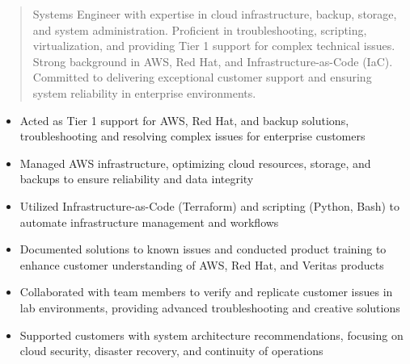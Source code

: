 



\makecvheader

\begin{quote}
  \noindent
  Systems Engineer with expertise in cloud infrastructure, backup, storage, and system administration. Proficient in troubleshooting, scripting, virtualization, and providing Tier 1 support for complex technical issues. Strong background in AWS, Red Hat, and Infrastructure-as-Code (IaC). Committed to delivering exceptional customer support and ensuring system reliability in enterprise environments.
\end{quote}

\par\smallskip
\noindent
\begin{minipage}{20cm}
  \begin{minipage}{9.75cm}
    \begin{itemize}
      \item Acted as Tier 1 support for AWS, Red Hat, and backup solutions, troubleshooting and resolving complex issues for enterprise customers
      \item Managed AWS infrastructure, optimizing cloud resources, storage, and backups to ensure reliability and data integrity
      \item Utilized Infrastructure-as-Code (Terraform) and scripting (Python, Bash) to automate infrastructure management and workflows
    \end{itemize}
  \end{minipage}
  \hfill
  \begin{minipage}{9.75cm}
    \begin{itemize}
      \item Documented solutions to known issues and conducted product training to enhance customer understanding of AWS, Red Hat, and Veritas products
      \item Collaborated with team members to verify and replicate customer issues in lab environments, providing advanced troubleshooting and creative solutions
      \item Supported customers with system architecture recommendations, focusing on cloud security, disaster recovery, and continuity of operations
    \end{itemize}
  \end{minipage}
\end{minipage}
\par\smallskip
\divider


